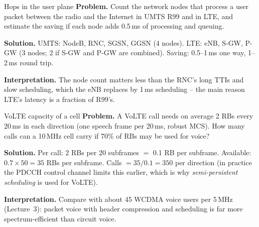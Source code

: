 \documentclass[11pt,a4paper]{article}
\begin{document}
\begin{examplebox}{Hops in the user plane}\label{ex:hops}
\textbf{Problem.} Count the network nodes that process a user packet between the radio and the
Internet in UMTS R99 and in LTE, and estimate the saving if each node adds 0.5\,ms of processing
and queuing.

\textbf{Solution.} UMTS: NodeB, RNC, SGSN, GGSN (4 nodes). LTE: eNB, S-GW, P-GW (3 nodes; 2 if
S-GW and P-GW are combined). Saving: 0.5--1\,ms one way, 1--2\,ms round trip.

\textbf{Interpretation.} The node count matters less than the RNC's long TTIs and slow
scheduling, which the eNB replaces by 1\,ms scheduling -- the main reason LTE's latency is a
fraction of R99's.
\end{examplebox}

\begin{examplebox}{VoLTE capacity of a cell}\label{ex:volte}
\textbf{Problem.} A VoLTE call needs on average 2 RBs every 20\,ms in each direction (one
speech frame per 20\,ms, robust MCS). How many calls can a 10\,MHz cell carry if 70\% of RBs may
be used for voice?

\textbf{Solution.} Per call: 2 RBs per 20 subframes $=$ 0.1 RB per subframe. Available: $0.7\times50
= 35$ RBs per subframe. Calls $= 35/0.1 = 350$ per direction (in practice the PDCCH control channel
limits this earlier, which is why \emph{semi-persistent scheduling} is used for VoLTE).

\textbf{Interpretation.} Compare with about 45 WCDMA voice users per 5\,MHz (Lecture~3): packet
voice with header compression and scheduling is far more spectrum-efficient than circuit voice.
\end{examplebox}

\end{document}
